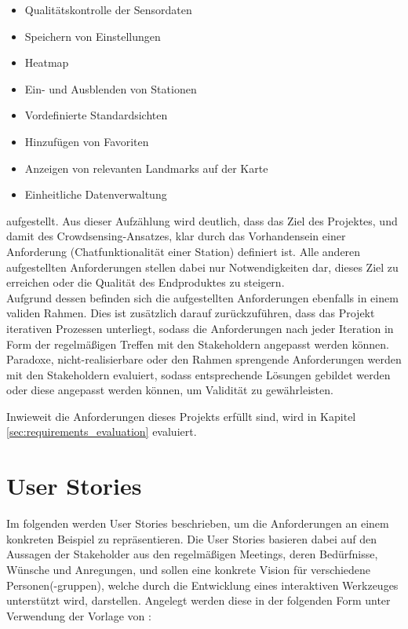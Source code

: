 \begin{itemize}
    \item Qualitätskontrolle der Sensordaten
    \item Speichern von Einstellungen
    \item Heatmap
    \item Ein- und Ausblenden von Stationen
    \item Vordefinierte Standardsichten
    \item Hinzufügen von Favoriten
    \item Anzeigen von relevanten Landmarks auf der Karte
    \item Einheitliche Datenverwaltung
\end{itemize}

aufgestellt. Aus dieser Aufzählung wird deutlich, dass das Ziel des Projektes, und damit des Crowdsensing-Ansatzes, klar durch das Vorhandensein einer Anforderung (Chatfunktionalität einer Station) definiert ist. Alle anderen aufgestellten Anforderungen stellen dabei nur Notwendigkeiten dar, dieses Ziel zu erreichen oder die Qualität des Endproduktes zu steigern. \\ Aufgrund dessen befinden sich die aufgestellten Anforderungen ebenfalls in einem validen Rahmen. Dies ist zusätzlich darauf zurückzuführen, dass das Projekt iterativen Prozessen unterliegt, sodass die Anforderungen nach jeder Iteration in Form der regelmäßigen Treffen mit den Stakeholdern angepasst werden können. Paradoxe, nicht-realisierbare oder den Rahmen sprengende Anforderungen werden mit den Stakeholdern evaluiert, sodass entsprechende Lösungen gebildet werden oder diese angepasst werden können, um Validität zu gewährleisten.

Inwieweit die Anforderungen dieses Projekts erfüllt sind, wird in Kapitel \ref{sec:requirements_evaluation} evaluiert. 

\section{User Stories}
Im folgenden werden User Stories beschrieben, um die Anforderungen an einem konkreten Beispiel zu repräsentieren. Die User Stories basieren dabei auf den Aussagen der Stakeholder aus den regelmäßigen Meetings, deren Bedürfnisse, Wünsche und Anregungen, und sollen eine konkrete Vision für verschiedene Personen(-gruppen), welche durch die Entwicklung eines interaktiven Werkzeuges unterstützt wird, darstellen. Angelegt werden diese in der folgenden Form unter Verwendung der Vorlage von \cite{AmblerUserStory}:

